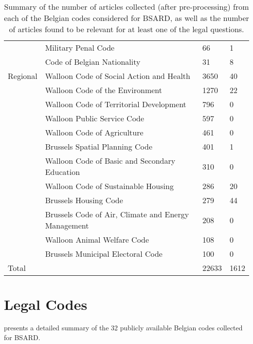 \documentclass[11pt]{article}
\begin{document}
\begin{table*}[ht!]
\begin{tabular}{llll}
          & Military Penal Code                                 & 66         & 1          \\
          & Code of Belgian Nationality                         & 31         & 8          \\ \hline
Regional  & Walloon Code of Social Action and Health            & 3650       & 40         \\
          & Walloon Code of the Environment                     & 1270       & 22         \\
          & Walloon Code of Territorial Development             & 796        & 0          \\
          & Walloon Public Service Code                         & 597        & 0          \\
          & Walloon Code of Agriculture                         & 461        & 0          \\
          & Brussels Spatial Planning Code                      & 401        & 1          \\
          & Walloon Code of Basic and Secondary Education       & 310        & 0          \\
          & Walloon Code of Sustainable Housing                 & 286        & 20         \\
          & Brussels Housing Code                               & 279        & 44         \\
          & Brussels Code of Air, Climate and Energy Management & 208        & 0          \\
          & Walloon Animal Welfare Code                         & 108        & 0          \\
          & Brussels Municipal Electoral Code                   & 100        & 0          \\ \hline
Total     &                                                     & 22633      & 1612       \\
\hline
\end{tabular}
\caption{Summary of the number of articles collected (after pre-processing) from each of the Belgian codes considered for BSARD, as well as the number of articles found to be relevant for at least one of the legal questions.}
\label{tab:codes}
\end{table*}

\section{Legal Codes\label{app:legal_codes}}
 presents a detailed summary of the 32 publicly available Belgian codes collected for BSARD.
\end{document}
